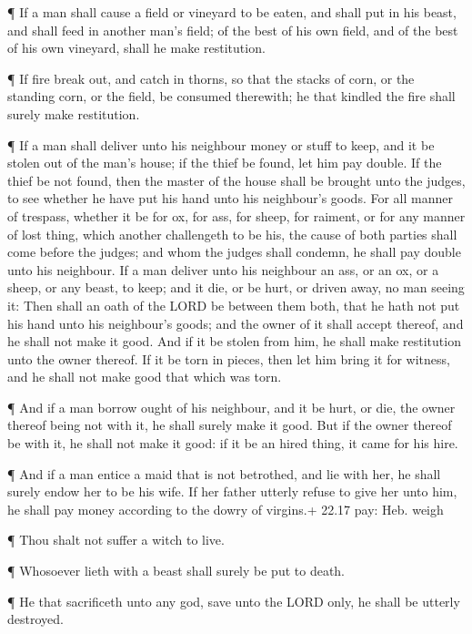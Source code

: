  ¶ If a man shall cause a field or vineyard to be eaten, and
shall put in his beast, and shall feed in another man's field; of the
best of his own field, and of the best of his own vineyard, shall he
make restitution.

 ¶ If fire break out, and catch in thorns, so that the
stacks of corn, or the standing corn, or the field, be consumed
therewith; he that kindled the fire shall surely make restitution.

 ¶ If a man shall deliver unto his neighbour money or stuff
to keep, and it be stolen out of the man's house; if the thief be found,
let him pay double.  If the thief be not found, then the
master of the house shall be brought unto the judges, to see whether he
have put his hand unto his neighbour's goods.  For all
manner of trespass, whether it be for ox, for ass, for sheep, for
raiment, or for any manner of lost thing, which another challengeth to
be his, the cause of both parties shall come before the judges; and whom
the judges shall condemn, he shall pay double unto his neighbour.
 If a man deliver unto his neighbour an ass, or an ox, or a
sheep, or any beast, to keep; and it die, or be hurt, or driven away, no
man seeing it:  Then shall an oath of the LORD be between
them both, that he hath not put his hand unto his neighbour's goods; and
the owner of it shall accept thereof, and he shall not make it good.
 And if it be stolen from him, he shall make restitution
unto the owner thereof.  If it be torn in pieces, then let
him bring it for witness, and he shall not make good that which was
torn.

 ¶ And if a man borrow ought of his neighbour, and it be
hurt, or die, the owner thereof being not with it, he shall surely make
it good.  But if the owner thereof be with it, he shall not
make it good: if it be an hired thing, it came for his hire.

 ¶ And if a man entice a maid that is not betrothed, and
lie with her, he shall surely endow her to be his wife.  If
her father utterly refuse to give her unto him, he shall pay money
according to the dowry of virgins.+ 22.17 pay: Heb. weigh

 ¶ Thou shalt not suffer a witch to live.

 ¶ Whosoever lieth with a beast shall surely be put to
death.

 ¶ He that sacrificeth unto any god, save unto the LORD
only, he shall be utterly destroyed.

